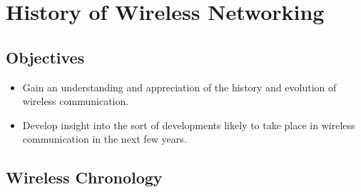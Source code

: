 \chapter{History of Wireless Networking}\label{history}

\minitoc 


\section*{Objectives}
\begin{itemize}

\item Gain an understanding and appreciation of the history and evolution of wireless communication.

\item Develop insight into the sort of developments likely to take place in wireless communication
in the next few years.

\end{itemize}

\section{Wireless Chronology}

